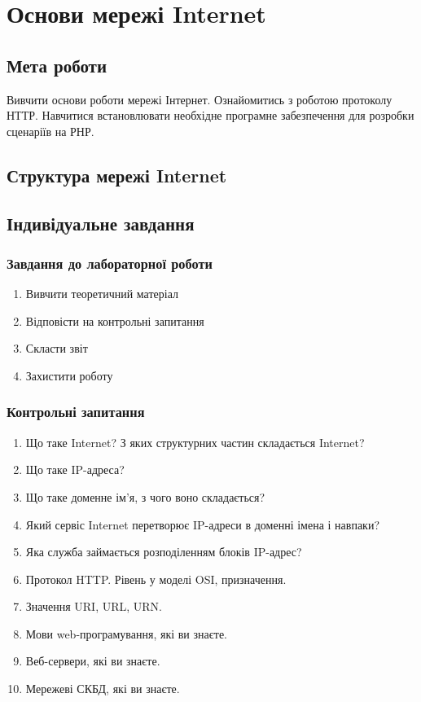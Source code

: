\chapter{Основи мережі Internet}
\nopagebreak[4]
\section*{Мета роботи}
Вивчити основи роботи мережі Інтернет. Ознайомитись з роботою протоколу НТТР. Навчитися встановлювати необхідне програмне забезпечення для розробки сценаріїв на РНР.
\nopagebreak[4]
\section{Структура мережі Internet}
\nopagebreak[4]


\section{Індивідуальне завдання}
\nopagebreak[4]
\subsection*{Завдання до лабораторної роботи}
\nopagebreak[4]
\begin{enumerate}
\item Вивчити теоретичний матеріал
\item Відповісти на контрольні запитання
\item Скласти звіт
\item Захистити роботу
\end{enumerate}

\subsection*{Контрольні запитання}
\nopagebreak[4]
\begin{enumerate}
\item Що таке Internet? З яких структурних частин складається Internet?
\item Що таке IP-адреса?
\item Що таке доменне ім'я, з чого воно складається?
\item Який сервіс Internet перетворює IP-адреси в доменні імена і навпаки?
\item Яка служба займається розподіленням блоків IP-адрес?
\item Протокол HTTP. Рівень у моделі OSI, призначення.
\item Значення URI, URL, URN.
\item Мови web-програмування, які ви знаєте.
\item Веб-сервери, які ви знаєте.
\item Мережеві СКБД, які ви знаєте. 
\end{enumerate}



